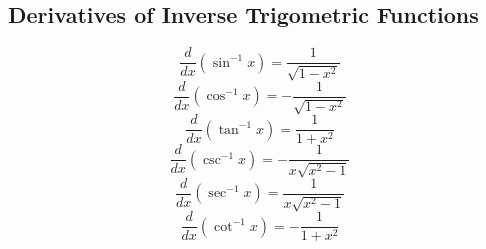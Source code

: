 \subsection*{Derivatives of Inverse Trigometric Functions}

\[ \frac{d}{dx}(\sin^{-1}x) = \frac{1}{\sqrt{1-x^2}} \]
\[ \frac{d}{dx}(\cos^{-1}x) = -\frac{1}{\sqrt{1-x^2}} \]
\[ \frac{d}{dx}(\tan^{-1}x) = \frac{1}{1+x^2} \]
\[ \frac{d}{dx}(\csc^{-1}x) = -\frac{1}{x\sqrt{x^2 -1}} \]
\[ \frac{d}{dx}(\sec^{-1}x) = \frac{1}{x\sqrt{x^2 -1}} \]
\[ \frac{d}{dx}(\cot^{-1}x) = -\frac{1}{1+x^2} \]
